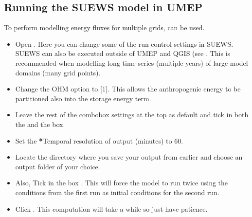 \documentclass[letterpaper,10pt,english]{sphinxmanual}
\begin{document}
\subsection{Running the SUEWS model in UMEP}
\label{\detokenize{Tutorials/SuewsSpatial:running-the-suews-model-in-umep}}
To perform modelling energy fluxes for multiple grids, {\hyperref[\detokenize{processor/Urban Energy Balance Urban Energy Balance (SUEWS.BLUEWS, advanced):suewsadvanced}]{}} can be used.
\begin{itemize}
\item {} 
Open . Here you can change some of the run control settings in SUEWS. SUEWS can also be executed outside of UMEP and QGIS (see . This is recommended when modelling long time series (multiple years) of large model domains (many grid points).

\item {} 
Change the OHM option to {[}1{]}. This allows the anthropogenic energy to be partitioned also into the storage energy term.

\item {} 
Leave the rest of the combobox settings at the top as default and tick in both the  and the  box.

\item {} 
Set the {\color{red}\bfseries{}*}Temporal resolution of output (minutes) to 60.

\item {} 
Locate the directory where you save your output from  earlier and choose an output folder of your choice.

\item {} 
Also, Tick in the box . This will force the model to run twice using the conditions from the first run as initial conditions for the second run.

\item {} 
Click . This computation will take a while so just have patience.

\end{itemize}
\end{document}
